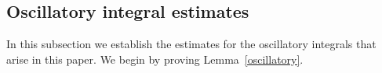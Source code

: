 \documentclass[reqno]{amsart}
\numberwithin{equation}{section}
\begin{document}
\subsection{Oscillatory integral estimates}
In this subsection we establish the estimates for the oscillatory integrals that arise in this paper. We begin by proving Lemma~\ref{oscillatory}.

\end{document}
